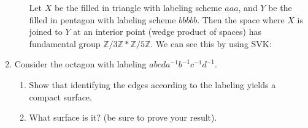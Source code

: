 \documentclass[11pt]{article}
\begin{document}
\begin{enumerate}
\begin{enumerate}
        Let $X$ be the filled in triangle with labeling scheme $aaa$, and $Y$ be the filled in pentagon with labeling scheme $bbbbb$. Then the space where $X$ is joined to $Y$ at an interior point (wedge product of spaces) has fundamental group $\mathbb{Z}/3\mathbb{Z}\ast \mathbb{Z}/5\mathbb{Z}$. We can see this by using SVK: \vspace*{30em} 
    \end{enumerate}
    \item Consider the octagon with labeling $abcda^{-1}b^{-1}c^{-1}d^{-1}$.\begin{enumerate}
        \item Show that identifying the edges according to the labeling yields a compact surface.
        \item What surface is it? (be sure to prove your result).
    \end{enumerate}
    \newpage
    $\!$
    \newpage
    $\!$
\end{enumerate}
\end{document}
